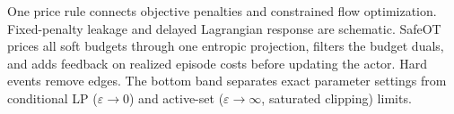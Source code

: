 One price rule connects objective penalties and constrained flow optimization. Fixed-penalty leakage and delayed Lagrangian response are schematic. SafeOT prices all soft budgets through one entropic projection, filters the budget duals, and adds feedback on realized episode costs before updating the actor. Hard events remove edges. The bottom band separates exact parameter settings from conditional LP ($\varepsilon\to0$) and active-set ($\varepsilon\to\infty$, saturated clipping) limits.